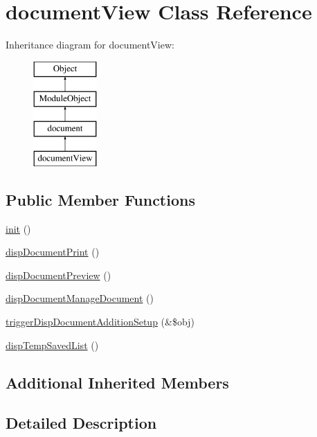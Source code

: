 \hypertarget{classdocumentView}{}\section{document\+View Class Reference}
\label{classdocumentView}
Inheritance diagram for document\+View\+:\begin{figure}[H]
\begin{center}
\leavevmode
\includegraphics[height=4.000000cm]{classdocumentView}
\end{center}
\end{figure}
\subsection*{Public Member Functions}
\begin{DoxyCompactItemize}
\item 
\hyperlink{classdocumentView_a198da8ed86ff84d45687f2783113b799}{init} ()
\item 
\hyperlink{classdocumentView_aab058bbbfedaeb2d9b6bb1505d5e3b9c}{disp\+Document\+Print} ()
\item 
\hyperlink{classdocumentView_af93051602dbf3254f05d1d0ada402907}{disp\+Document\+Preview} ()
\item 
\hyperlink{classdocumentView_a5a358d7106e98e64179115b3966639de}{disp\+Document\+Manage\+Document} ()
\item 
\hyperlink{classdocumentView_a0ea8992b5f032e29e528cbb9ab1b709c}{trigger\+Disp\+Document\+Addition\+Setup} (\&\$obj)
\item 
\hyperlink{classdocumentView_a849d0bdc714a0ea2fd23bbe86f2fde6f}{disp\+Temp\+Saved\+List} ()
\end{DoxyCompactItemize}
\subsection*{Additional Inherited Members}


\subsection{Detailed Description}


